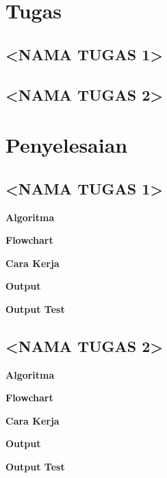 \documentclass{article}
\begin{document}
\section{Tugas}

\subsection{<NAMA TUGAS 1>}


\subsection{<NAMA TUGAS 2>}

\section{Penyelesaian}

\subsection{<NAMA TUGAS 1>}

\textbf{Algoritma}

\textbf{Flowchart}

\textbf{Cara Kerja}

\textbf{Output}

\textbf{Output Test}

\subsection{<NAMA TUGAS 2>}

\textbf{Algoritma}

\textbf{Flowchart}

\textbf{Cara Kerja}

\textbf{Output}

\textbf{Output Test}
\end{document}
